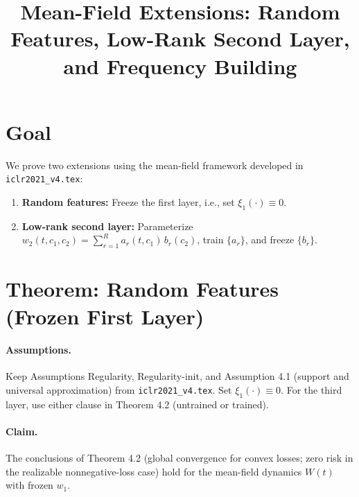 \documentclass{article}
\title{Mean-Field Extensions: Random Features, Low-Rank Second Layer, and Frequency Building}
\author{}
\date{}
\begin{document}
\maketitle

\section{Goal}

We prove two extensions using the mean-field framework developed in \texttt{iclr2021\_v4.tex}:

\begin{enumerate}
    \item \textbf{Random features:} Freeze the first layer, i.e., set $\xi_{1}(\cdot)\equiv 0$.
    \item \textbf{Low-rank second layer:} Parameterize $w_{2}(t,c_{1},c_{2}) = \sum_{r=1}^{R} a_{r}(t,c_{1})\, b_{r}(c_{2})$, train $\{a_{r}\}$, and freeze $\{b_{r}\}$.
\end{enumerate}

\section{Theorem: Random Features (Frozen First Layer)}

\paragraph{Assumptions.} Keep Assumptions Regularity, Regularity-init, and Assumption 4.1 (support and universal approximation) from \texttt{iclr2021\_v4.tex}. Set $\xi_{1}(\cdot)\equiv 0$. For the third layer, use either clause in Theorem 4.2 (untrained or trained).

\paragraph{Claim.} The conclusions of Theorem 4.2 (global convergence for convex losses; zero risk in the realizable nonnegative-loss case) hold for the mean-field dynamics $W(t)$ with frozen $w_{1}$.
\end{document}
